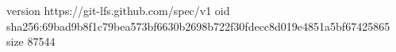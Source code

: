 version https://git-lfs.github.com/spec/v1
oid sha256:69bad9b8f1c79bea573bf6630b2698b722f30fdecc8d019e4851a5bf67425865
size 87544
